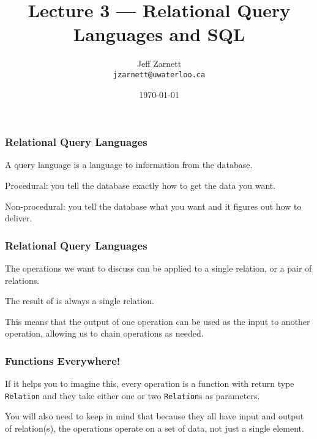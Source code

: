 

\title{Lecture 3 --- Relational Query Languages and SQL}

\author{Jeff Zarnett \\ \small \texttt{jzarnett@uwaterloo.ca}}
\date{\today}




\begin{frame}
  \titlepage

 \end{frame}



\begin{frame}
\frametitle{Relational Query Languages}

A \alert{query language} is a language to information from the database. 

Procedural: you tell the database exactly how to get the data you want.

Non-procedural: you tell the database what you want and it figures out how to deliver.

\end{frame}



\begin{frame}
\frametitle{Relational Query Languages}

The operations we want to discuss can be applied to a single relation, or a pair of relations.

The result of is always a single relation. 

This means that the output of one operation can be used as the input to another operation, allowing us to chain operations as needed. 

\end{frame}



\begin{frame}
\frametitle{Functions Everywhere!}

If it helps you to imagine this, every operation is a function with return type \texttt{Relation} and they take either one or two \texttt{Relation}s as parameters.

You will also need to keep in mind that because they all have input and output of relation(s), the operations operate on a set of data, not just a single element.


\end{frame}



